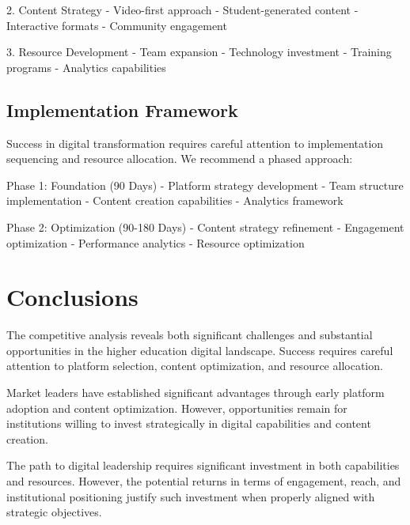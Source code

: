 \documentclass[12pt]{report}
\begin{document}
2. Content Strategy
   - Video-first approach
   - Student-generated content
   - Interactive formats
   - Community engagement

3. Resource Development
   - Team expansion
   - Technology investment
   - Training programs
   - Analytics capabilities

\section{Implementation Framework}

Success in digital transformation requires careful attention to implementation sequencing and resource allocation. We recommend a phased approach:

Phase 1: Foundation (90 Days)
- Platform strategy development
- Team structure implementation
- Content creation capabilities
- Analytics framework

Phase 2: Optimization (90-180 Days)
- Content strategy refinement
- Engagement optimization
- Performance analytics
- Resource optimization

\chapter{Conclusions}

The competitive analysis reveals both significant challenges and substantial opportunities in the higher education digital landscape. Success requires careful attention to platform selection, content optimization, and resource allocation.

Market leaders have established significant advantages through early platform adoption and content optimization. However, opportunities remain for institutions willing to invest strategically in digital capabilities and content creation.

The path to digital leadership requires significant investment in both capabilities and resources. However, the potential returns in terms of engagement, reach, and institutional positioning justify such investment when properly aligned with strategic objectives.
\end{document}
